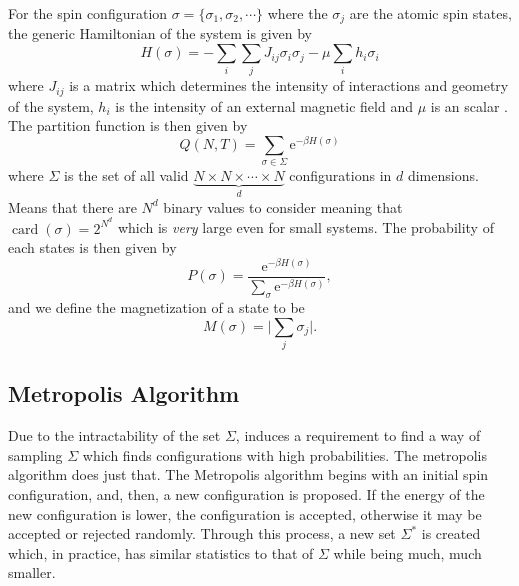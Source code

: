 \documentclass{llncs}
\newcommand{\ee}[1]{\ensuremath{\textrm{e}^{#1}}}
\DeclareMathOperator\card{card}
\begin{document}
For the spin configuration $\sigma=\{\sigma_1,\sigma_2,\cdots\}$ where the $\sigma_j$ are the atomic spin states, the generic Hamiltonian of the system is given by
\begin{equation}
H(\sigma)=-\sum_i\sum_jJ_{ij}\sigma_i\sigma_j-\mu\sum_ih_i\sigma_i
\end{equation}
where $J_{ij}$ is a matrix which determines the intensity of interactions and geometry of the system, $h_i$ is the intensity of an external magnetic field and $\mu$ is an scalar \cite{onsager}. The partition function is then given by 
\begin{equation}
Q(N,T)=\sum_{\sigma\in\Sigma}\ee{-\beta H(\sigma)}
\end{equation}
where $\Sigma$ is the set of all valid $\underbrace{N\times N\times\cdots\times N}_{d}$ configurations in $d$ dimensions. Means that there are $N^d$ binary values to consider meaning that $\card(\sigma)=2^{N^d}$ which is \emph{very} large even for small systems. The probability of each states is then given by 
\begin{equation}
P(\sigma)=\frac{\ee{-\beta H(\sigma)}}{\sum_{\sigma}\ee{-\beta H(\sigma)}},
\end{equation}
and we define the magnetization of a state to be 
\begin{equation} 
M(\sigma)=\Big\vert\sum_j \sigma_j\Big\vert.
\end{equation}

\subsection{Metropolis Algorithm}
Due to the intractability of the set $\Sigma$, induces a requirement to find a way of sampling $\Sigma$ which finds configurations with high probabilities. The metropolis algorithm does just that. The Metropolis algorithm begins with an initial spin configuration, and, then, a new configuration is proposed. If the energy of the new configuration is lower, the configuration is accepted, otherwise it may be accepted or rejected randomly. Through this process, a new set $\Sigma^*$ is created which, in practice, has similar statistics to that of $\Sigma$ while being much, much smaller. 
\end{document}
